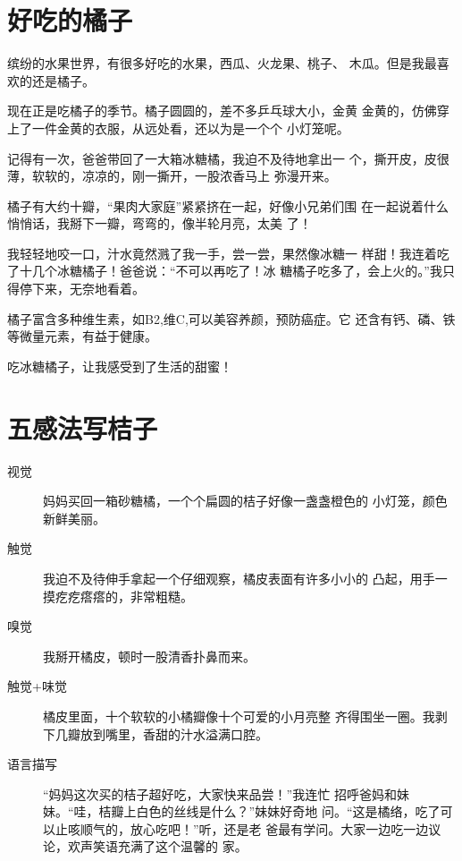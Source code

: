 \documentclass{article}
\begin{document}
\begin{pinyinscope}
    \section*{好吃的橘子}

    

    缤纷的水果世界，有很多好吃的水果，西瓜、火龙果、桃子、%
    木瓜。但是我最喜欢的还是橘子。
    
    现在正是吃橘子的季节。橘子圆圆的，差不多乒乓球大小，金黄%
    金黄的，仿佛穿上了一件金黄的衣服，从远处看，还以为是一个个%
    小灯笼呢。
    
    记得有一次，爸爸带回了一大箱冰糖橘，我迫不及待地拿出一%
    个，撕开皮，皮很薄，软软的，凉凉的，刚一撕开，一股浓香马上%
    弥漫开来。
    
    橘子有大约十瓣，``果肉大家庭''紧紧挤在一起，好像小兄弟们围%
    在一起说着什么悄悄话，我掰下一瓣，弯弯的，像半轮月亮，太美%
    了！
    
    我轻轻地咬一口，汁水竟然溅了我一手，尝一尝，果然像冰糖一%
    样甜！我连着吃了十几个冰糖橘子！爸爸说：``不可以再吃了！冰%
    糖橘子吃多了，会上火的。''我只得停下来，无奈地看着。
    
    橘子富含多种维生素，如B2,维C,可以美容养颜，预防癌症。它%
    还含有钙、磷、铁等微量元素，有益于健康。
    
    吃冰糖橘子，让我感受到了生活的甜蜜！

    \section*{五感法写桔子}    

    \begin{description}
        \item[视觉]妈妈买回一箱砂糖橘，一个个扁圆的桔子好像一盏盏橙色的%
        小灯笼，颜色新鲜美丽。
        \item[触觉]我迫不及待伸手拿起一个仔细观察，橘皮表面有许多小小的
        凸起，用手一摸疙疙瘩瘩的，非常粗糙。
        \item[嗅觉]我掰开橘皮，顿时一股清香扑鼻而来。
        \item[触觉+味觉]橘皮里面，十个软软的小橘瓣像十个可爱的小月亮整%
        齐得围坐一圈。我剥下几瓣放到嘴里，香甜的汁水溢满口腔。
        \item[语言描写]``妈妈这次买的桔子超好吃，大家快来品尝！''我连忙%
        招呼爸妈和妹妹。``哇，桔瓣上白色的丝线是什么？''妹妹好奇地%
        问。``这是橘络，吃了可以止咳顺气的，放心吃吧！''听，还是老%
        爸最有学问。大家一边吃一边议论，欢声笑语充满了这个温馨的%
        家。
    \end{description}
\end{pinyinscope}
\end{document}
